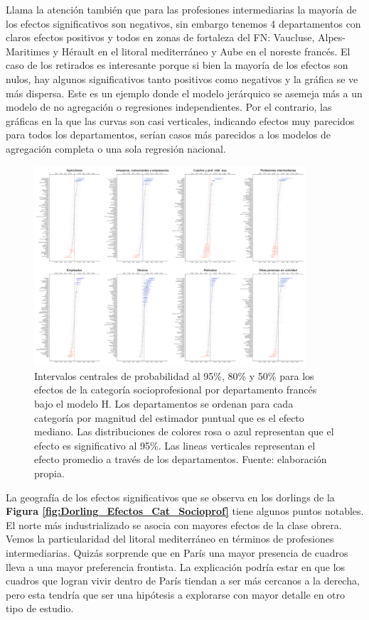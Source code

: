 Llama la atención también que para las profesiones intermediarias la mayoría de los efectos significativos son negativos, sin embargo tenemos 4 departamentos con claros efectos positivos y todos en zonas de fortaleza del FN: Vaucluse, Alpes-Maritimes y Hérault en el litoral mediterráneo y Aube en el noreste francés. El caso de los retirados es interesante porque si bien la mayoría de los efectos son nulos, hay algunos significativos tanto positivos como negativos y la gráfica se ve más dispersa. Este es un ejemplo donde el modelo jerárquico se asemeja más a un modelo de no agregación o regresiones independientes. Por el contrario, las gráficas en la que las curvas son casi verticales, indicando efectos muy parecidos para todos los departamentos, serían casos más parecidos a los modelos de agregación completa o una sola regresión nacional.\\ 

\begin{figure}[h]
	\centering
	\includegraphics[width = 0.9\textwidth]{Figs/Efectos/Efectos_Cat_Socioprof_Modelo_H}
	\caption{Intervalos centrales de probabilidad al 95\%, 80\% y 50\% para los efectos de la categoría socioprofesional por departamento francés bajo el modelo H. Los departamentos se ordenan para cada categoría por magnitud del estimador puntual que es el efecto mediano. Las distribuciones de colores rosa o azul representan que el efecto es significativo al 95\%. Las lineas verticales representan el efecto promedio a través de los departamentos. Fuente: elaboración propia.}
	\label{fig:Efectos_Cat_Socioprof}
\end{figure}

La geografía de los efectos significativos que se observa en los dorlings de la \textbf{Figura \ref{fig:Dorling_Efectos_Cat_Socioprof}} tiene algunos puntos notables. El norte más industrializado se asocia con mayores efectos de la clase obrera. Vemos la particularidad del litoral mediterráneo en términos de profesiones intermediarias. Quizás sorprende que en París una mayor presencia de cuadros lleva a una mayor preferencia frontista. La explicación podría estar en que los cuadros que logran vivir dentro de París tiendan a ser más cercanos a la derecha, pero esta tendría que ser una hipótesis a explorarse con mayor detalle en otro tipo de estudio. 


